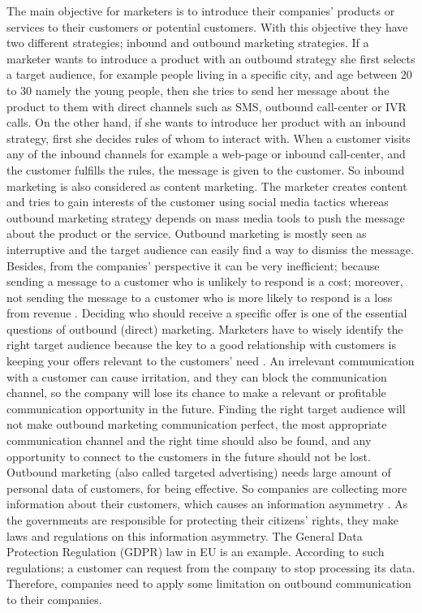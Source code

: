 \documentclass[11pt]{article}
\begin{document}
The main objective for marketers is to introduce their companies’ products or services to their customers or potential customers. With this objective they have two different strategies; inbound and outbound marketing strategies. If a marketer wants to introduce a product with an outbound strategy she first selects a target audience, for example people living in a specific city, and age between 20 to 30 namely the young people, then she tries to send her message about the product to them with direct channels such as SMS, outbound call-center or IVR calls. On the other hand, if she wants to introduce her product with an inbound strategy, first she decides rules of whom to interact with. When a customer visits any of the inbound channels for example a web-page or inbound call-center, and the customer fulfills the rules, the message is given to the customer. So inbound marketing is also considered as content marketing. The marketer creates content and tries to gain interests of the customer using social media tactics whereas outbound marketing strategy depends on mass media tools to push the message about the product or the service. Outbound marketing is mostly seen as interruptive and the target audience can easily find a way to dismiss the message. Besides, from the companies’ perspective it can be very inefficient; because sending a message to a customer who is unlikely to respond is a cost; moreover, not sending the message to a customer who is more likely to respond is a loss from revenue \citep{sarkar}. Deciding who should receive a specific offer is one of the essential questions of outbound (direct) marketing. Marketers have to wisely identify the right target audience because the key to a good relationship with customers is keeping your offers relevant to the customers’ need \citep{malthouse}. An irrelevant communication with a customer can cause irritation, and they can block the communication channel, so the company will lose its chance to make a relevant or profitable communication opportunity in the future. Finding the right target audience will not make outbound marketing communication perfect, the most appropriate communication channel and the right time should also be found, and any opportunity to connect to the customers in the future should not be lost.\\

Outbound marketing (also called targeted advertising) needs large amount of personal data of customers, for being effective. So companies are collecting more information about their customers, which causes an information asymmetry \citep{waerdt}. As the governments are responsible for protecting their citizens’ rights, they make laws and regulations on this information asymmetry. The General Data Protection Regulation (GDPR) law in EU is an example. According to such regulations; a customer can request from the company to stop processing its data. Therefore, companies need to apply some limitation on outbound communication to their companies.\\
\end{document}
